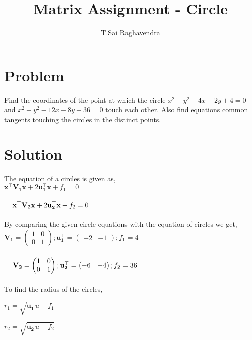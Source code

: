 \documentclass[journal,12pt,twocolumn]{IEEEtran}
\title{\mytitle}
\title{
Matrix Assignment - Circle
}
\author{T.Sai Raghavendra}
\newcommand{\myvec}[1]{\ensuremath{\begin{pmatrix}#1\end{pmatrix}}}
\let\vec\mathbf
\begin{document}
\maketitle
\tableofcontents
\bigskip


\section{\textbf{Problem}}
Find the coordinates of the point at which the circle $x^2+y^2-4x-2y+4=0$ and $x^2+y^2-12x-8y+36        =0$ touch each other. Also find equations common tangents touching the circles in the distinct points.\\


\section{\textbf{Solution}}
The equation of a circles is given as,   \\

${\vec{x^{\top}V_1 x} + 2\vec{u_1^{\top}x}} + f_1=0$
\\
\\
${\hspace{0.4cm}\vec{x^{\top}V_2 x} + 2\vec{u_2^{\top}x}} + f_2=0$
\\
\\
By comparing the given circle equations with the equation of circles we get,
\\

$\vec{V_1}=\myvec{1&0\\ 0&1} ; \vec{u_1^{\top}}=\myvec{-2&-1} ; f_1=4$
\\
\\
$\hspace*{0.4cm}\vec{V_2}=\myvec{1&0\\ 0&1} ; \vec{u_2^{\top}}=\myvec{-6&-4} ; f_2=36$
\\
\\

To find the radius of the circles,
\\
\begin{center}
$r_1 = {\sqrt{\vec{u_1^\top}u - f_1}}$
\end{center}
\vspace*{0.1cm}

\begin{center}
$r_2 = {\sqrt{\vec{u_2^\top}u - f_2}}$
\end{center}
\vspace*{0.1cm}
\end{document}
